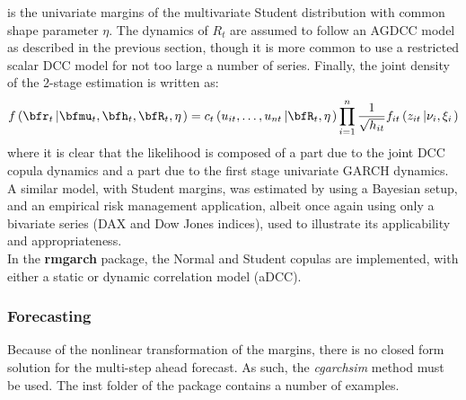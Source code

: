 is the univariate margins of the multivariate Student distribution with common
shape parameter $\eta$. The dynamics of $R_t$ are assumed to follow an AGDCC
model as described in the previous section, though it is more common to use a
restricted scalar DCC model for not too large a number of series. Finally, the
joint density of the 2-stage estimation is written as:
\begin{equation}\label{eq:copula14}
f\left( {{\bfr_t}\left| {{\bfmu _t},{\bfh_t}},{\bfR_t},\eta \right.} \right) = {c_t}\left( {{u_{it}},\dots,{u_{nt}}\left| {{\bfR_t},\eta } \right.} \right)\prod\limits_{i = 1}^n {\frac{1}
{{\sqrt {{h_{it}}} }}{f_{it}}\left( {{z_{it}}\left| {{\nu _i},{\xi _i}} \right.} \right)}
\end{equation}
where it is clear that the likelihood is composed of a part due to the joint DCC
copula dynamics and a part due to the first stage univariate GARCH dynamics.\\
A similar model, with Student margins, was estimated by \cite{Ausin2010}
using a Bayesian setup, and an empirical risk management application, albeit once
again using only a bivariate series (DAX and Dow Jones indices), used to illustrate
its applicability and appropriateness.\\
In the {\bf rmgarch} package, the Normal and Student copulas are implemented,
with either a static or dynamic correlation model (aDCC).
\subsubsection{Forecasting}
Because of the nonlinear transformation of the margins, there is no closed
form solution for the multi-step ahead forecast. As such, the \emph{cgarchsim}
method must be used. The inst folder of the package contains a number of examples.

